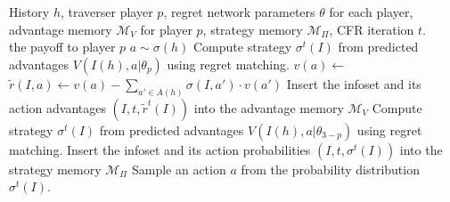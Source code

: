 \documentclass{article}
\newcommand{\adam}[1]{\textbf{\textcolor{magenta}{#1}}}
\begin{document}
\begin{algorithm*}[!ht]
\caption{CFR Traversal with External Sampling}
\begin{algorithmic}
 History $h$, traverser player $p$, regret network parameters $\theta$ for each player, advantage memory $\mathcal{M}_{V}$ for player $p$, strategy memory $\mathcal{M}_{\Pi}$, CFR iteration $t$.
\\
\State \Return the payoff to player $p$
    \State $a \sim \sigma(h)$
    \State \Return {}
 
    \State Compute strategy $\sigma^t(I)$ from predicted advantages $V(I(h),a|\theta_p)$ using regret matching. 
        \State $v(a) \gets$  
	\EndFor
	    \State $\tilde{r}(I,a) \gets v(a) - \sum_{a'\in A(h)}{\sigma(I,a')\cdot v(a')}$ 
    \EndFor
    \State Insert the infoset and its action advantages $(I, t, \tilde{r}^t(I))$ into the advantage memory $\mathcal{M}_{V}$
\Else {}
    \State Compute strategy $\sigma^t(I)$ from predicted advantages $V(I(h), a|\theta_{3-p})$ using regret matching.
    \State Insert the infoset and its action probabilities $(I, t, \sigma^t(I))$ into the strategy memory $\mathcal{M}_{\Pi}$
    \State Sample an action $a$ from the probability distribution $\sigma^t(I)$.
    \State \Return {}
\EndIf
\EndFunction

\end{algorithmic}
\end{algorithm*}


\end{document}
